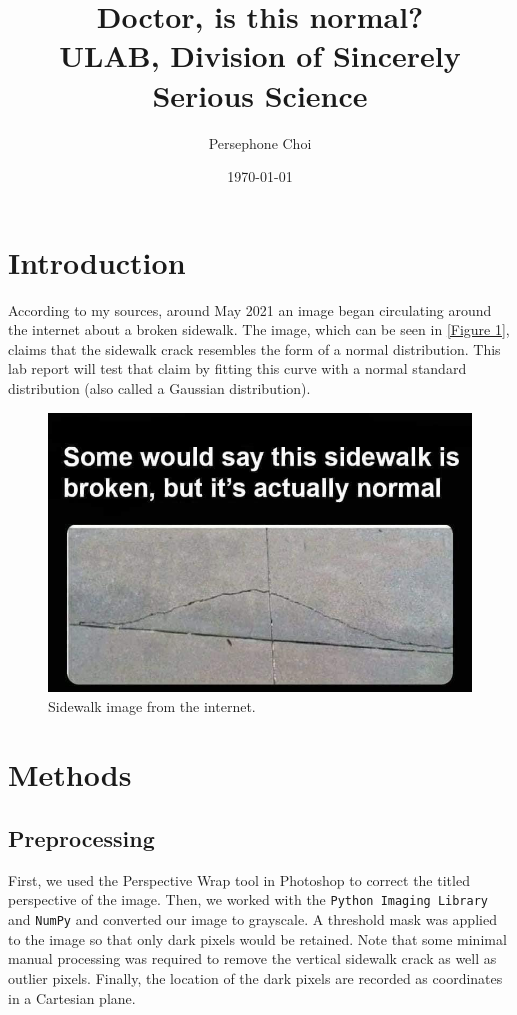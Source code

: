 \documentclass{article}
\title{Doctor, is this normal?\\ \large ULAB, Division of Sincerely Serious Science}
\author{Persephone Choi}
\date{\today}
\begin{document}
\maketitle

\section{Introduction}
According to my sources, around May 2021 an image began circulating around the internet about a broken sidewalk. The image, which can be seen in \autoref{Figure 1}, claims that the sidewalk crack resembles the form of a normal distribution. This lab report will test that claim by fitting this curve with a normal standard distribution (also called a Gaussian distribution).

\begin{figure}[h]
    \centering
    \includegraphics[width=0.8\linewidth]{img.jpg}
    \caption{Sidewalk image from the internet.}
    \label{Figure 1}
\end{figure}

\section{Methods}

\subsection{Preprocessing}

First, we used the Perspective Wrap tool in Photoshop to correct the titled perspective of the image. Then, we worked with the \texttt{Python Imaging Library} and \texttt{NumPy}\cite{2020NumPy-Array} and converted our image to grayscale.
A threshold mask was applied to the image so that only dark pixels would be retained. Note that some minimal manual processing was required to remove the vertical sidewalk crack as well as outlier pixels.
Finally, the location of the dark pixels are recorded as coordinates in a Cartesian plane.
\end{document}
